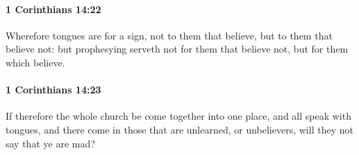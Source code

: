 		\paragraph{1 Corinthians 14:22} %
			\label{1CORINTHIANS-14-22}

			Wherefore tongues are for a sign, not to them that believe, but to them that believe not: but prophesying serveth not for them that believe not, but for them which believe.

			\begin{framed}
				\scriptsize
				\begin{compactdesc}
					\item[SBLG] 
				\end{compactdesc}
			\end{framed}

		\paragraph{1 Corinthians 14:23} %
			\label{1CORINTHIANS-14-23}

			If therefore the whole church be come together into one place, and all speak with tongues, and there come in those that are unlearned, or unbelievers, will they not say that ye are mad?

